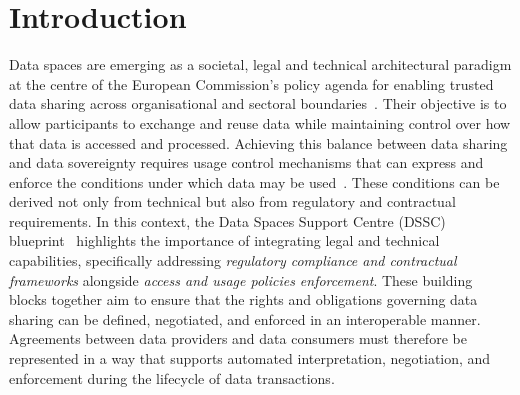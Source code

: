 \section{Introduction}
\label{sec:intro}

Data spaces are emerging as a
societal, legal and technical architectural paradigm
at the centre of the European Commission's policy agenda
for enabling trusted data sharing across organisational
and sectoral boundaries~\cite{farrell_european_2023}.
Their objective is to allow participants
to exchange and reuse data while maintaining control over
how that data is accessed and processed.
Achieving this balance between
data sharing and data sovereignty
requires usage control mechanisms
that can express and enforce the conditions
under which data may be used~\cite{eitel_usage_2021}.
These conditions can be derived not only from technical
but also from regulatory and contractual requirements.
In this context,
the Data Spaces Support Centre (DSSC) blueprint~\cite{data_spaces_support_centre_summary_2026}
highlights the importance of integrating legal and technical capabilities,
specifically addressing \emph{regulatory compliance and contractual frameworks}
alongside \emph{access and usage policies enforcement}.
These building blocks together aim to ensure that
the rights and obligations governing data sharing can be
defined, negotiated, and enforced in an interoperable manner.
Agreements between data providers and data consumers
must therefore be represented in a way that
supports automated interpretation, negotiation,
and enforcement during the lifecycle of data transactions.

